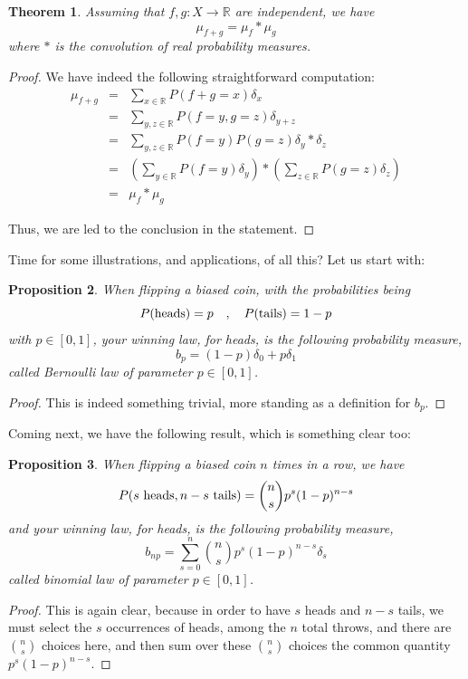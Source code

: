 \documentclass[12pt]{amsbook}
\newtheorem{theorem}{Theorem}[chapter]
\newtheorem{proposition}[theorem]{Proposition}
\begin{document}
\begin{theorem}
Assuming that $f,g:X\to\mathbb R$ are independent, we have
$$\mu_{f+g}=\mu_f*\mu_g$$
where $*$ is the convolution of real probability measures.
\end{theorem}

\begin{proof}
We have indeed the following straightforward computation:
\begin{eqnarray*}
\mu_{f+g}
&=&\sum_{x\in\mathbb R}P(f+g=x)\delta_x\\
&=&\sum_{y,z\in\mathbb R}P(f=y,g=z)\delta_{y+z}\\
&=&\sum_{y,z\in\mathbb R}P(f=y)P(g=z)\delta_y*\delta_z\\
&=&\left(\sum_{y\in\mathbb R}P(f=y)\delta_y\right)*\left(\sum_{z\in\mathbb R}P(g=z)\delta_z\right)\\
&=&\mu_f*\mu_g
\end{eqnarray*}

Thus, we are led to the conclusion in the statement.
\end{proof}

Time for some illustrations, and applications, of all this? Let us start with:

\begin{proposition}
When flipping a biased coin, with the probabilities being
$$P({\rm heads})=p\quad,\quad P({\rm tails})=1-p$$
with $p\in[0,1]$, your winning law, for heads, is the following probability measure,
$$b_p=(1-p)\delta_0+p\delta_1$$
called Bernoulli law of parameter $p\in[0,1]$.
\end{proposition}

\begin{proof}
This is indeed something trivial, more standing as a definition for $b_p$.
\end{proof}

Coming next, we have the following result, which is something clear too:


\begin{proposition}
When flipping a biased coin $n$ times in a row, we have
$$P(s\ {\rm heads}, n-s\ {\rm tails})=\binom{n}{s}p^s(1-p)^{n-s}$$
and your winning law, for heads, is the following probability measure,
$$b_{np}=\sum_{s=0}^n\binom{n}{s}p^s(1-p)^{n-s}\delta_s$$
called binomial law of parameter $p\in[0,1]$.
\end{proposition}

\begin{proof}
This is again clear, because in order to have $s$ heads and $n-s$ tails, we must select the $s$ occurrences of heads, among the $n$ total throws, and there are $\binom{n}{s}$ choices here, and then sum over these $\binom{n}{s}$ choices the common quantity $p^s(1-p)^{n-s}$.
\end{proof}
\end{document}
